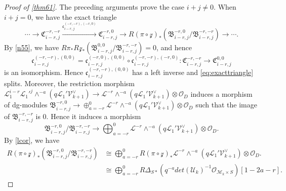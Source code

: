 \documentclass{amsart}
\numberwithin{equation}{section}
\newcommand\mc{\mathcal}
\newcommand\mf{\mathfrak}
\theoremstyle{definition}
\theoremstyle{remark}
\begin{document}
\begin{proof}[Proof of \cref{thm61}]
The preceding arguments prove the case $i+j\neq 0$. When $i+j=0$, we have the exact triangle
 \begin{equation}
   \label{eq:exacttriangle}
   \cdots \to \mf{C}_{i-r,j}^{-r,-r} \xrightarrow{\mf{c}_{i-r,j}^{(-r,-r),(-r,0)}} \mf{C}_{i-r,j}^{-r,0}\to R(\pi\circ \mc{z})_{*}(\mf{B}_{i-r,j}^{-r,0}/\mf{B}_{i-r,j}^{-r,-r})\to \cdots.
 \end{equation}
By \cref{n55}, we have 
$R\pi_{*}R\mc{z}_{*}(\mf{B}_{i-r,j}^{0,0}/\mf{B}_{i-r,j}^{-r,-r})=0$, and hence
\begin{equation}
  \label{laeq}
\mf{c}_{i-r,j}^{(-r,-r),(0,0)}=\mf{c}_{i-r,j}^{(-r,0),(0,0)}\circ \mf{c}_{i-r,j}^{(-r,-r),(-r,0)}:\mf{C}_{i-r,j}^{-r,-r}\to \mf{C}_{i-r,j}^{0,0}  
\end{equation}
is an isomorphism. Hence $\mf{c}_{i-r,j}^{(-r,-r),(0,0)}$ has a left inverse and \cref{eq:exacttriangle} splits. Moreover, the restriction morphism $\mc{L}_{1}^{i-r}\mc{L}_{1}'^{j}\wedge^{-a}(q\mc{L}_{1}'\mc{V}_{k+1}^{\vee})\to \mc{L}^{-r}\wedge^{-a}(q\mc{L}_{1}'\mc{V}_{k+1}^{\vee})\otimes \mc{O}_{D}$ induces a morphism of dg-modules $\mf{B}_{i-r,j}^{-r,0}\to \oplus_{a=-r}^{0}\mc{L}^{-r}\wedge^{-a}(q\mc{L}_{1}'\mc{V}_{k+1}^{\vee})\otimes \mc{O}_{D}$
such that the image of $\mf{B}_{i-r,j}^{-r,-r}$ is $0$. Hence it induces a morphism
$$\mf{B}_{i-r,j}^{-r,0}/\mf{B}_{i-r,j}^{-r,-r}\to \bigoplus_{a=-r}^{0}\mc{L}^{-r}\wedge^{-a}(q\mc{L}_{1}'\mc{V}_{k+1}^{\vee})\otimes \mc{O}_{D}.$$
By \cref{lcor}, we have
\begin{align*}
  R(\pi\circ \mc{z})_{*}(\mf{B}_{i-r,j}^{-r,0}/\mf{B}_{i-r,j}^{-r,-r})&\cong \bigoplus_{a=-r}^{0}R(\pi\circ \mc{z})_{*}\mc{L}^{-r}\wedge^{-a}(q\mc{L}_{1}'\mc{V}_{k+1}^{\vee})\otimes \mc{O}_{D}. \\
  &\cong \bigoplus_{a=-r}^{0} R\Delta_{S*}(q^{-a}det(\mc{U}_{k})^{-1}\mc{O}_{\mc{M}_{k}\times S})[1-2a-r].
\end{align*}
\end{proof}
\end{document}
